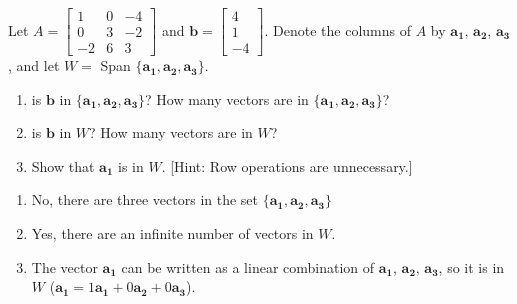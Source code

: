 \documentclass{mathhomework}
\newcommand{\Vect}[1]{\pmb{#1}}
\begin{document}
\pagebreak
\begin{problem}[1.3\#25]
    Let $A = \begin{bmatrix}
        1 & 0 & -4 \\
        0 & 3 & -2 \\
        -2 & 6 & 3
    \end{bmatrix}$ and $\Vect{b} = \begin{bmatrix}4 \\ 1 \\ -4\end{bmatrix}$. Denote the columns of $A$ by $\Vect{a_1}$, $\Vect{a_2}$, $\Vect{a_3}$, and let $W = $ Span $\{\Vect{a_1},\Vect{a_2},\Vect{a_3}\}$.
    
    \begin{enumerate}[label=(\alph*)]
        \item is $\Vect{b}$ in $\{\Vect{a_1},\Vect{a_2},\Vect{a_3}\}$? How many vectors are in $\{\Vect{a_1},\Vect{a_2},\Vect{a_3}\}$?
        \item is $\Vect{b}$ in $W$? How many vectors are in $W$?
        \item Show that $\Vect{a_1}$ is in $W$. [Hint: Row operations are unnecessary.]
    \end{enumerate}

    \begin{solution}
        \begin{enumerate}[label=(\alph*)]
            \item No, there are three vectors in the set $\{\Vect{a_1}, \Vect{a_2}, \Vect{a_3}\}$
            \item Yes, there are an infinite number of vectors in $W$.
            \item The vector $\Vect{a_1}$ can be written as a linear combination of $\Vect{a_1}$, $\Vect{a_2}$, $\Vect{a_3}$, so it is in $W$ ($\Vect{a_1} = 1\Vect{a_1} + 0 \Vect{a_2} + 0 \Vect{a_3}$).
        \end{enumerate}
    \end{solution}
\end{problem}
\end{document}
